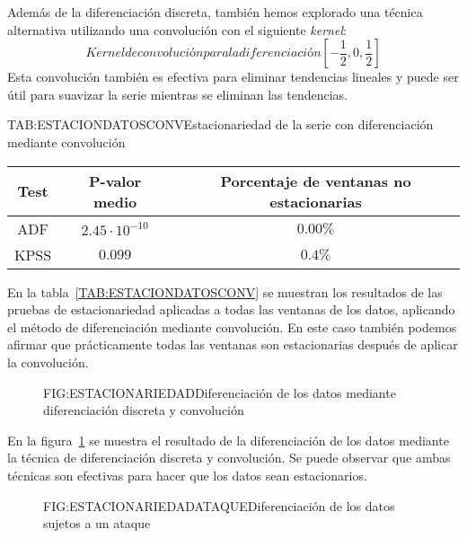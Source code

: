 Además de la diferenciación discreta, también hemos explorado una técnica alternativa utilizando una convolución con el siguiente \textit{kernel}:
\begin{equation}{\textit{Kernel} de convolución para la diferenciación}   
    [-\frac{1}{2}, 0, \frac{1}{2}]
\end{equation}
Esta convolución también es efectiva para eliminar tendencias lineales y puede ser útil para suavizar la serie mientras se eliminan las tendencias.

\begin{table}[Estacionariedad de la serie con diferenciación mediante convolución]{TAB:ESTACIONDATOSCONV}{Estacionariedad de la serie con diferenciación mediante convolución}
    \begin{tabular}{|c|c|c|}
        \hline
        \textbf{Test} & \textbf{P-valor medio} & \textbf{Porcentaje de ventanas no estacionarias} \\
        \hline
        ADF & $2.45\cdot 10^{-10}$ & $0.00\%$ \\
        KPSS & $0.099$ & $0.4\%$ \\
        \hline
    \end{tabular}
\end{table}

En la tabla~\ref{TAB:ESTACIONDATOSCONV} se muestran los resultados de las pruebas de estacionariedad aplicadas a todas las ventanas de los datos, aplicando el método de diferenciación mediante convolución. En este caso también podemos afirmar que prácticamente todas las ventanas son estacionarias después de aplicar la convolución.

\begin{figure}[Diferenciación de los datos mediante diferenciación discreta y convolución]{FIG:ESTACIONARIEDAD}{Diferenciación de los datos mediante diferenciación discreta y convolución}
    \label{FIG:ESTACIONARIEDAD}
\end{figure}

En la figura~\ref{FIG:ESTACIONARIEDAD} se muestra el resultado de la diferenciación de los datos mediante la técnica de diferenciación discreta y convolución. Se puede observar que ambas técnicas son efectivas para hacer que los datos sean estacionarios.

\begin{figure}[Diferenciación de los datos sujeto a un ataque]{FIG:ESTACIONARIEDADATAQUE}{Diferenciación de los datos sujetos a un ataque}
    \label{FIG:ESTACIONARIEDADATAQUE}
\end{figure}

